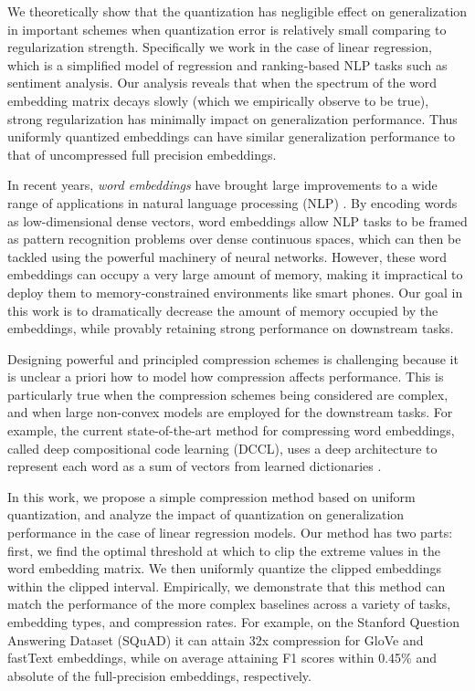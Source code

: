 We theoretically show that the quantization has negligible effect on generalization in important schemes when quantization error is relatively small comparing to regularization strength. Specifically we work in the case of linear regression, which is a simplified model of regression and ranking-based NLP tasks such as sentiment analysis. Our analysis reveals that when the spectrum of the word embedding matrix decays slowly (which we empirically observe to be true), strong regularization has minimally impact on generalization performance. Thus uniformly quantized embeddings can have similar generalization performance to that of uncompressed full precision embeddings.




In recent years, \textit{word embeddings} \citep{word2vec13,glove14,fasttext18} have brought large improvements to a wide range of applications in natural language processing (NLP) \citep{collins16,drqa17}.
By encoding words as low-dimensional dense vectors, word embeddings allow NLP tasks to be framed as pattern recognition problems over dense continuous spaces, which can then be tackled using the powerful machinery of neural networks.
However, these word embeddings can occupy a very large amount of memory, making it impractical to deploy them to memory-constrained environments like smart phones.
Our goal in this work is to dramatically decrease the amount of memory occupied by the embeddings, while provably retaining strong performance on downstream tasks.

Designing powerful and principled compression schemes is challenging because it is unclear a priori how to model how compression affects performance.
This is particularly true when the compression schemes being considered are complex, and when large non-convex models are employed for the downstream tasks.
For example, the current state-of-the-art method for compressing word embeddings, called deep compositional code learning (DCCL), uses a deep architecture to represent each word as a sum of vectors from learned dictionaries \citep{dccl17}.

In this work, we propose a simple compression method based on uniform quantization, and analyze the impact of quantization on generalization performance in the case of linear regression models.
Our method has two parts: first, we find the optimal threshold at which to clip the extreme values in the word embedding matrix.  We then uniformly quantize the clipped embeddings within the clipped interval.
Empirically, we demonstrate that this method can match the performance of the more complex baselines across a variety of tasks, embedding types, and compression rates.
For example, on the Stanford Question Answering Dataset (SQuAD) \citep{squad16} it can attain 32x compression for GloVe and fastText embeddings, while on average attaining F1 scores within 0.45\% and  absolute of the full-precision embeddings, respectively.


